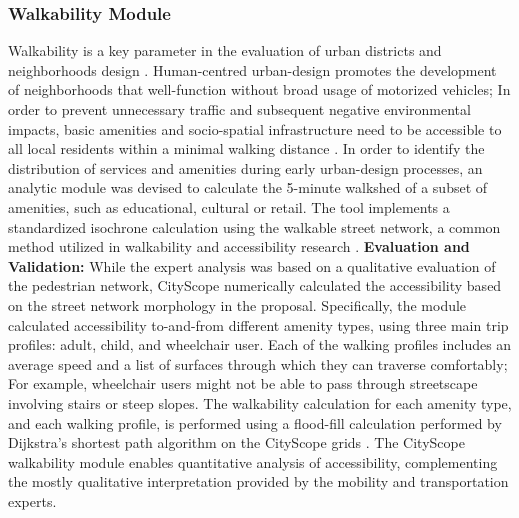 {{        \subsubsection{Walkability Module}
        {
            Walkability is a key parameter in the evaluation of urban districts and neighborhoods design \cite{carr1969city, krier1979urban}. Human-centred urban-design promotes the development of neighborhoods that well-function without broad usage of motorized vehicles; In order to prevent unnecessary traffic and subsequent negative environmental impacts, basic amenities and socio-spatial infrastructure need to be accessible to all local residents within a minimal walking distance \cite{banerjee2011companion}. In order to identify the distribution of services and amenities during early urban-design processes, an analytic module was devised to calculate the 5-minute walkshed of a subset of amenities, such as educational, cultural or retail. The tool implements a standardized isochrone calculation using the walkable street network, a common method utilized in walkability and accessibility research \cite{dp20, dwp17}.
            \newline
            \textbf{Evaluation and Validation:} While the expert analysis was based on a qualitative evaluation of the pedestrian network, CityScope numerically calculated the accessibility based on the street network morphology in the proposal. Specifically, the module calculated accessibility to-and-from different amenity types, using three main trip profiles: adult, child, and wheelchair user. Each of the walking profiles includes an average speed and a list of surfaces through which they can traverse comfortably; For example, wheelchair users might not be able to pass through streetscape involving stairs or steep slopes. The walkability calculation for each amenity type, and each walking profile, is performed using a flood-fill calculation performed by Dijkstra's shortest path algorithm on the CityScope grids \cite{eldg14}. The CityScope walkability module enables quantitative analysis of accessibility, complementing the mostly qualitative interpretation provided by the mobility and transportation experts.
        }

}}
